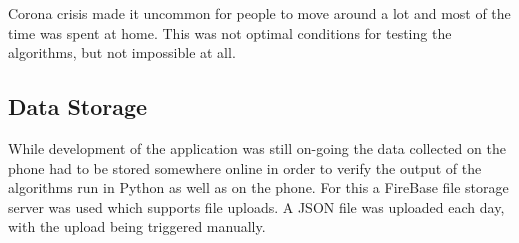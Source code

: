 Corona crisis made it uncommon for people to move around a lot and most of the time was spent at home. This was not optimal conditions for testing the algorithms, but not impossible at all.

\subsection{Data Storage}
While development of the application was still on-going the data collected on the phone had to be stored somewhere online in order to verify the output of the algorithms run in Python as well as on the phone. For this a FireBase file storage server was used which supports file uploads. A JSON file was uploaded each day, with the upload being triggered manually. 


